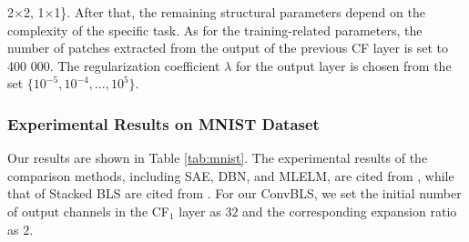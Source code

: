 \documentclass[lettersize,journal]{IEEEtran}
\begin{document}
2$\times$2, 1$\times$1\}. After that, the remaining structural parameters depend on the complexity of the specific task. As for the training-related parameters, the number of patches extracted from the output of the previous CF layer is set to 400 000. The regularization coefficient $\lambda$ for the output layer is chosen from the set $\{10^{-5}, 10^{-4}, ..., 10^{5}\}$.

\subsubsection{Experimental Results on MNIST Dataset}
Our results are shown in Table \ref{tab:mnist}. The experimental results of the comparison methods, including SAE, DBN, and MLELM, are cited from \cite{tang2015extreme}, while that of Stacked BLS are cited from \cite{liu2020stacked}. For our ConvBLS, we set the initial number of output channels in the CF$_1$ layer as $32$ and the corresponding expansion ratio as $2$.
\end{document}
